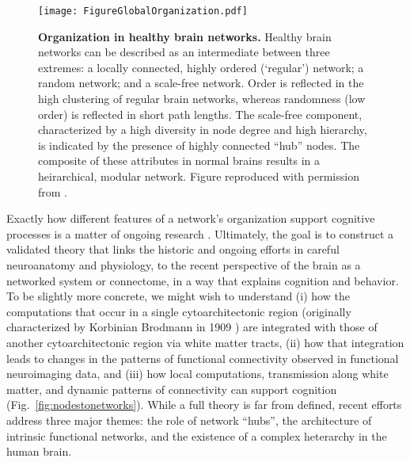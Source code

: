 \documentclass[12pt]{article}
\begin{document}
 \begin{figure}[h!]
 	\centerline{\texttt{[image: FigureGlobalOrganization.pdf]}}
 	\caption{\textbf{Organization in healthy brain networks.} Healthy brain networks can be described as an intermediate between three extremes: a locally connected, highly ordered (`regular') network; a random network; and a scale-free network. Order is reflected in the high clustering of regular brain networks, whereas randomness (low order) is reflected in short path lengths. The scale-free component, characterized by a high diversity in node degree and high hierarchy, is indicated by the presence of highly connected ``hub'' nodes.  The composite of these attributes in normal brains results in a heirarchical, modular network. Figure reproduced with permission from \cite{Stam2014}.}
 	\label{fig:globalhealthyorganization}
 	\centering
 \end{figure}
\newpage

Exactly how different features of a network's organization support cognitive processes is a matter of ongoing research \cite{Sporns2014,medaglia2015cognitive}. Ultimately, the goal is to construct a validated theory that links the historic and ongoing efforts in careful neuroanatomy and physiology, to the recent perspective of the brain as a networked system or connectome, in a way that explains cognition and behavior. To be slightly more concrete, we might wish to understand (i) how the computations that occur in a single cytoarchitectonic region (originally characterized by Korbinian Brodmann in 1909 \cite{Brodmann1909}) are integrated with those of another cytoarchitectonic region via white matter tracts, (ii) how that integration leads to changes in the patterns of functional connectivity observed in functional neuroimaging data, and (iii) how local computations, transmission along white matter, and dynamic patterns of connectivity can support cognition (Fig.~\ref{fig:nodestonetworks}). While a full theory is far from defined, recent efforts address three major themes: the role of network ``hubs'', the architecture of intrinsic functional networks, and the existence of a complex heterarchy in the human brain.
\end{document}
